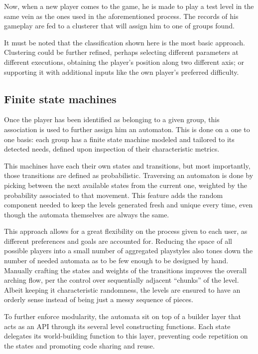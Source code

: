 \documentclass[conference]{IEEEtran}
\begin{document}
Now, when a new player comes to the game, he is made to play a test level in the same vein as the ones used in the aforementioned process. The records of his gameplay are fed to a clusterer that will assign him to one of groups found.

It must be noted that the classification shown here is the most basic approach. Clustering could be further refined, perhaps selecting different parameters at different executions, obtaining the player's position along two different axis; or supporting it with additional inputs like the own player's preferred difficulty.

\subsection{Finite state machines}

Once the player has been identified as belonging to a given group, this association is used to further assign him an automaton. This is done on a one to one basis: each group has a finite state machine modeled and tailored to its detected needs, defined upon inspection of their characteristic metrics.

This machines have each their own states and transitions, but most importantly, those transitions are defined as probabilistic. Traversing an automaton is done by picking between the next available states from the current one, weighted by the probability associated to that movement. This feature adds the random component needed to keep the levels generated fresh and unique every time, even though the automata themselves are always the same.

This approach allows for a great flexibility on the process given to each user, as different preferences and goals are accounted for. Reducing the space of all possible players into a small number of aggregated playstyles also tones down the number of needed automata as to be few enough to be designed by hand. Manually crafting the states and weights of the transitions improves the overall arching flow, per the control over sequentially adjacent ``chunks'' of the level. Albeit keeping it characteristic randomness, the levels are ensured to have an orderly sense instead of being just a messy sequence of pieces.

To further enforce modularity, the automata sit on top of a builder layer that acts as an API through its several level constructing functions. Each state delegates its world-building function to this layer, preventing code repetition on the states and promoting code sharing and reuse. 
\end{document}
